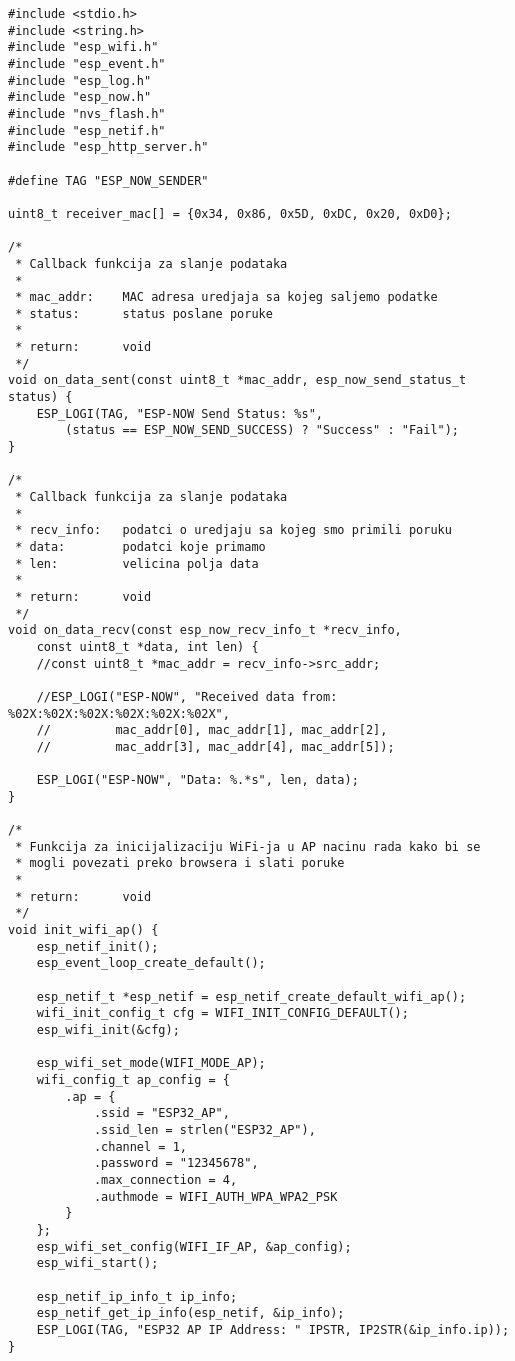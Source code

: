 \documentclass[seminarskirad]{fer}
\begin{document}
\newpage

\begin{lstlisting}[caption=ESP-NOW sender]
#include <stdio.h>
#include <string.h>
#include "esp_wifi.h"
#include "esp_event.h"
#include "esp_log.h"
#include "esp_now.h"
#include "nvs_flash.h"
#include "esp_netif.h"
#include "esp_http_server.h"

#define TAG "ESP_NOW_SENDER"

uint8_t receiver_mac[] = {0x34, 0x86, 0x5D, 0xDC, 0x20, 0xD0};

/*
 * Callback funkcija za slanje podataka
 * 
 * mac_addr:    MAC adresa uredjaja sa kojeg saljemo podatke
 * status:      status poslane poruke
 * 
 * return:      void
 */
void on_data_sent(const uint8_t *mac_addr, esp_now_send_status_t status) {
    ESP_LOGI(TAG, "ESP-NOW Send Status: %s", 
        (status == ESP_NOW_SEND_SUCCESS) ? "Success" : "Fail");
}

/*
 * Callback funkcija za slanje podataka
 * 
 * recv_info:   podatci o uredjaju sa kojeg smo primili poruku
 * data:        podatci koje primamo
 * len:         velicina polja data
 * 
 * return:      void
 */
void on_data_recv(const esp_now_recv_info_t *recv_info, 
    const uint8_t *data, int len) {
    //const uint8_t *mac_addr = recv_info->src_addr;

    //ESP_LOGI("ESP-NOW", "Received data from: %02X:%02X:%02X:%02X:%02X:%02X",
    //         mac_addr[0], mac_addr[1], mac_addr[2], 
    //         mac_addr[3], mac_addr[4], mac_addr[5]);

    ESP_LOGI("ESP-NOW", "Data: %.*s", len, data);
}

/*
 * Funkcija za inicijalizaciju WiFi-ja u AP nacinu rada kako bi se 
 * mogli povezati preko browsera i slati poruke
 * 
 * return:      void
 */
void init_wifi_ap() {
    esp_netif_init();
    esp_event_loop_create_default();

    esp_netif_t *esp_netif = esp_netif_create_default_wifi_ap();
    wifi_init_config_t cfg = WIFI_INIT_CONFIG_DEFAULT();
    esp_wifi_init(&cfg);

    esp_wifi_set_mode(WIFI_MODE_AP);
    wifi_config_t ap_config = {
        .ap = {
            .ssid = "ESP32_AP",
            .ssid_len = strlen("ESP32_AP"),
            .channel = 1,
            .password = "12345678",
            .max_connection = 4,
            .authmode = WIFI_AUTH_WPA_WPA2_PSK
        }
    };
    esp_wifi_set_config(WIFI_IF_AP, &ap_config);
    esp_wifi_start();

    esp_netif_ip_info_t ip_info;
    esp_netif_get_ip_info(esp_netif, &ip_info);
    ESP_LOGI(TAG, "ESP32 AP IP Address: " IPSTR, IP2STR(&ip_info.ip));
}


\end{lstlisting}
\end{document}
